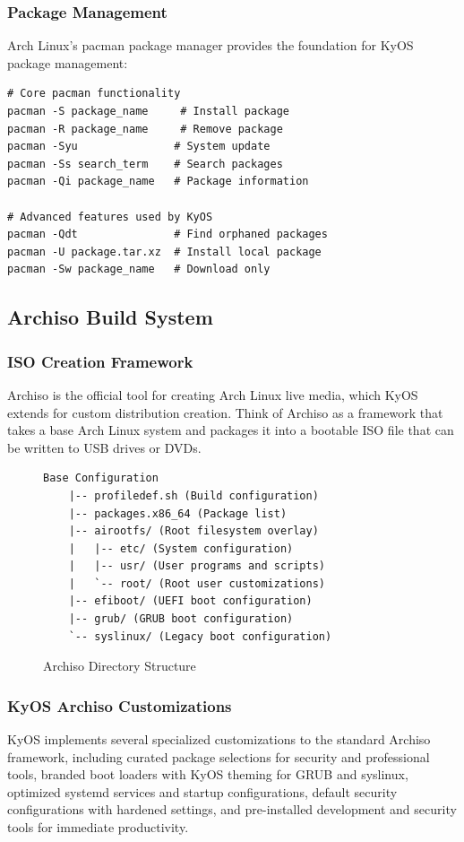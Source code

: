 \documentclass[12pt,a4paper]{article}
\begin{document}
\subsubsection{Package Management}
Arch Linux's pacman package manager provides the foundation for KyOS package management:

\begin{lstlisting}[caption=Pacman Package Management Features]
# Core pacman functionality
pacman -S package_name     # Install package
pacman -R package_name     # Remove package
pacman -Syu               # System update
pacman -Ss search_term    # Search packages
pacman -Qi package_name   # Package information

# Advanced features used by KyOS
pacman -Qdt               # Find orphaned packages
pacman -U package.tar.xz  # Install local package
pacman -Sw package_name   # Download only
\end{lstlisting}

\subsection{Archiso Build System}

\subsubsection{ISO Creation Framework}
Archiso is the official tool for creating Arch Linux live media, which KyOS extends for custom distribution creation. Think of Archiso as a framework that takes a base Arch Linux system and packages it into a bootable ISO file that can be written to USB drives or DVDs.

\begin{figure}[H]
\centering
\begin{lstlisting}[caption=Archiso Build Process]
Base Configuration
    |-- profiledef.sh (Build configuration)
    |-- packages.x86_64 (Package list)
    |-- airootfs/ (Root filesystem overlay)
    |   |-- etc/ (System configuration)
    |   |-- usr/ (User programs and scripts)
    |   `-- root/ (Root user customizations)
    |-- efiboot/ (UEFI boot configuration)
    |-- grub/ (GRUB boot configuration)
    `-- syslinux/ (Legacy boot configuration)
\end{lstlisting}
\caption{Archiso Directory Structure}
\end{figure}

\subsubsection{KyOS Archiso Customizations}
KyOS implements several specialized customizations to the standard Archiso framework, including curated package selections for security and professional tools, branded boot loaders with KyOS theming for GRUB and syslinux, optimized systemd services and startup configurations, default security configurations with hardened settings, and pre-installed development and security tools for immediate productivity.
\end{document}
